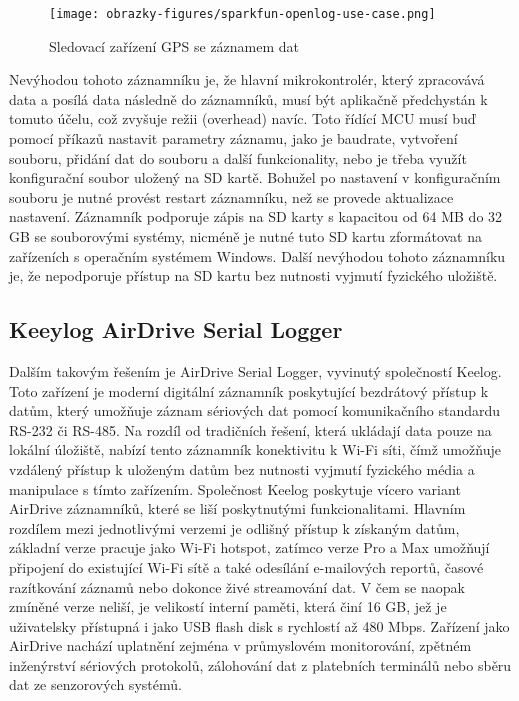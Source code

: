 \begin{figure}[h]
    \centering
    \texttt{[image: obrazky-figures/sparkfun-openlog-use-case.png]}
    
    \caption{Sledovací zařízení GPS se záznamem dat \cite{cirkit_openlog}}
    \label{fig:sparkfun-openlog-use-case}
\end{figure}

Nevýhodou tohoto záznamníku je, že hlavní mikrokontrolér, který zpracovává data a posílá data následně do záznamníků, musí být aplikačně předchystán k tomuto účelu, což zvyšuje režii (overhead) navíc. Toto řídící MCU musí buď pomocí příkazů nastavit parametry záznamu, jako je baudrate, vytvoření souboru, přidání dat do souboru a další funkcionality, nebo je třeba využít konfigurační soubor uložený na SD kartě. Bohužel po nastavení v konfiguračním souboru je nutné provést restart záznamníku, než se provede aktualizace nastavení. Záznamník podporuje zápis na SD karty s kapacitou od 64 MB do 32 GB se souborovými systémy, nicméně je nutné tuto SD kartu zformátovat na zařízeních s operačním systémem Windows. Další nevýhodou tohoto záznamníku je, že nepodporuje přístup na SD kartu bez nutnosti vyjmutí fyzického uložiště.

\subsection{Keeylog AirDrive Serial Logger}
\label{keelog_airdrive_serial_datalogger}
Dalším takovým řešením je AirDrive Serial Logger, vyvinutý společností Keelog. Toto zařízení je moderní digitální záznamník poskytující bezdrátový přístup k datům, který umožňuje záznam sériových dat pomocí komunikačního standardu RS-232 či RS-485. Na rozdíl od tradičních řešení, která ukládají data pouze na lokální úložiště, nabízí tento záznamník konektivitu k Wi-Fi síti, čímž umožňuje vzdálený přístup k uloženým datům bez nutnosti vyjmutí fyzického média a manipulace s tímto zařízením. Společnost Keelog poskytuje vícero variant AirDrive záznamníků, které se liší poskytnutými funkcionalitami. Hlavním rozdílem mezi jednotlivými verzemi je odlišný přístup k získaným datům, základní verze pracuje jako Wi-Fi hotspot, zatímco verze Pro a Max umožňují připojení do existující Wi-Fi sítě a také odesílání e-mailových reportů, časové razítkování záznamů nebo dokonce živé streamování dat. V čem se naopak zmíněné verze neliší, je velikostí interní paměti, která činí 16 GB, jež je uživatelsky přístupná i jako USB flash disk s rychlostí až 480 Mbps. Zařízení jako AirDrive nachází uplatnění zejména v průmyslovém monitorování, zpětném inženýrství sériových protokolů, zálohování dat z platebních terminálů nebo sběru dat ze senzorových systémů. \cite{keelog_airdrive_serial_datalogger, keelog_airdrive_serial_datalogger_max, keelog_airdrive_serial_datalogger_pro}


